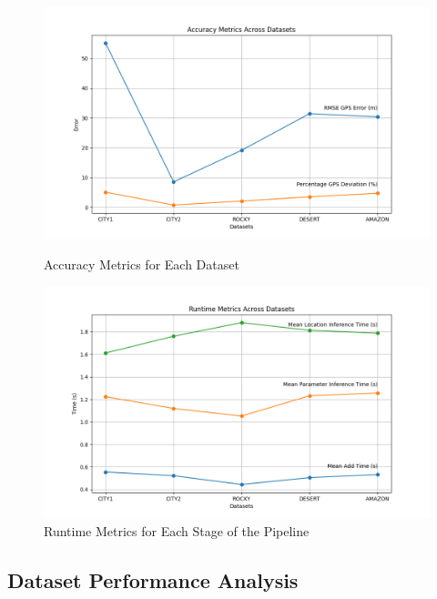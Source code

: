 \begin{figure}[H]
    \centering
    \begin{minipage}{0.45\textwidth}
        \centering
        \includegraphics[width=\textwidth]{Chapter 5/RESULTPLOTS/key metrics/Accuracy Datasets.png}
        \caption{Accuracy Metrics for Each Dataset}
        \label{fig:Per Dataset Metrics}
    \end{minipage}\hfill
    \begin{minipage}{0.45\textwidth}
        \centering
        \includegraphics[width=\textwidth]{Chapter 5/RESULTPLOTS/key metrics/Runtime Datasets.png}
        \caption{Runtime Metrics for Each Stage of the Pipeline}
        \label{fig: Dataset Metrics}
    \end{minipage}
\end{figure}



\subsection{Dataset Performance Analysis}

